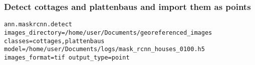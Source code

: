\subsubsection*{Detect cottages and plattenbaus and import them as points}

{\footnotesize
\begin{lstlisting}[breaklines=true]
ann.maskrcnn.detect images_directory=/home/user/Documents/georeferenced_images classes=cottages,plattenbaus model=/home/user/Documents/logs/mask_rcnn_houses_0100.h5 images_format=tif output_type=point
\end{lstlisting}
}
